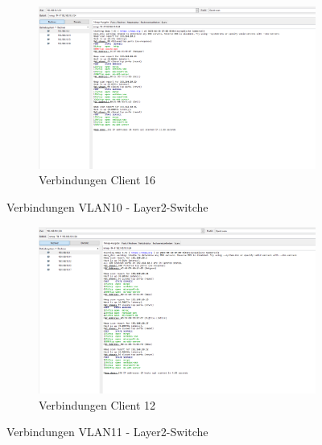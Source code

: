         \begin{figure}[H]\ContinuedFloat
        \centering
            \begin{subfigure}{\linewidth}
                \centering
                \includegraphics[width=\linewidth]{images/Einrichtung Layer2-Switche/ServerVLAN10Client16.png}
                \caption{Verbindungen Client 16}
            \end{subfigure}
        \caption{Verbindungen VLAN10 - Layer2-Switche}
        \end{figure}
        \begin{figure}[H]
        \centering
            \begin{subfigure}{\linewidth}
                \centering
                \includegraphics[width=\linewidth]{images/Einrichtung Layer2-Switche/ServerVLAN11Client12.png}
                \caption{Verbindungen Client 12}
            \end{subfigure}
        \caption{Verbindungen VLAN11 - Layer2-Switche}
        \end{figure}%
